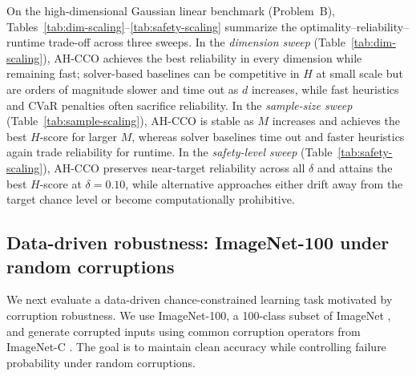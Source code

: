 \documentclass{uai2026} %
\theoremstyle{plain}
\theoremstyle{definition}
\begin{document}
On the high-dimensional Gaussian linear benchmark (Problem~B), Tables~\ref{tab:dim-scaling}--\ref{tab:safety-scaling} summarize the optimality--reliability--runtime trade-off across three sweeps.
In the \emph{dimension sweep} (Table~\ref{tab:dim-scaling}), AH-CCO achieves the best reliability in every dimension while remaining fast; solver-based baselines can be competitive in $H$ at small scale but are orders of magnitude slower and time out as $d$ increases, while fast heuristics and CVaR penalties often sacrifice reliability.
In the \emph{sample-size sweep} (Table~\ref{tab:sample-scaling}), AH-CCO is stable as $M$ increases and achieves the best $H$-score for larger $M$, whereas solver baselines time out and faster heuristics again trade reliability for runtime.
In the \emph{safety-level sweep} (Table~\ref{tab:safety-scaling}), AH-CCO preserves near-target reliability across all $\delta$ and attains the best $H$-score at $\delta{=}0.10$, while alternative approaches either drift away from the target chance level or become computationally prohibitive.

\subsection{Data-driven robustness: ImageNet-100 under random corruptions}\label{sec:imagenet100c}
We next evaluate a data-driven chance-constrained learning task motivated by corruption robustness.
We use ImageNet-100, a 100-class subset of ImageNet \citep{deng2009imagenet}, and generate corrupted inputs using common corruption operators from ImageNet-C \citep{hendrycks2019benchmarking}.
The goal is to maintain clean accuracy while controlling failure probability under random corruptions.
\end{document}
